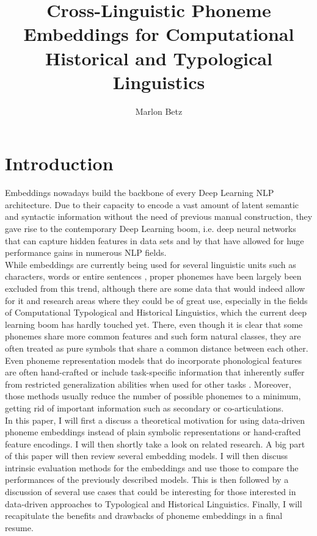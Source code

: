 \documentclass[11pt]{article}
\title{Cross-Linguistic Phoneme Embeddings for Computational Historical and Typological Linguistics}
\author{Marlon Betz}
\begin{document}
\maketitle
\newpage
\tableofcontents

\section{Introduction}
Embeddings nowadays build the backbone of every Deep Learning NLP architecture. Due to their capacity to encode a vast amount of latent semantic and syntactic information without the need of previous manual construction, they gave rise to the contemporary Deep Learning boom, i.e. deep neural networks that can capture hidden features in data sets and by that have allowed for huge performance gains in numerous NLP fields. \\While embeddings are currently being used for several linguistic units such as characters\cite{kim2015character,dos2014learning,zhang2015character}, words \cite{mikolov2013efficient,mikolov2013distributed,pennington2014glove} or entire sentences \cite{kiros2015skip}, proper phonemes have been largely been excluded from this trend, although there are some data that would indeed allow for it and research areas where they could be of great use, especially in the fields of Computational Typological and Historical Linguistics, which the current deep learning boom has hardly touched yet. There, even though it is clear that some phonemes share more common features and such form natural classes, they are often treated as pure symbols that share a common distance between each other. Even phoneme representation models that do incorporate phonological features are often hand-crafted \cite{kondrak2000new,rama2016siamese} or include task-specific information that inherently suffer from restricted generalization abilities when used for other tasks \cite{jager2014phylogenetic}. Moreover, those methods usually reduce the number of possible phonemes to a minimum, getting rid of important information such as secondary or co-articulations. \\
In this paper, I will first a discuss a theoretical motivation for using data-driven phoneme embeddings instead of plain symbolic representations or hand-crafted feature encodings. I will then shortly take a look on related research. A big part of this paper will then review several embedding models. I will then discuss intrinsic evaluation methods for the embeddings and use those to compare the performances of the previously described models. This is then followed by a discussion of several use cases that could be interesting for those interested in data-driven approaches to Typological and Historical Linguistics. Finally, I will recapitulate the benefits and drawbacks of phoneme embeddings in a final resume.
\end{document}
